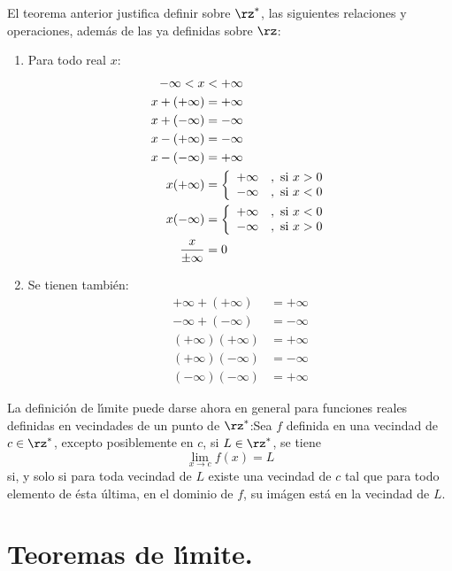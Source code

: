 El teorema anterior justifica definir sobre $\rz^{\ast}$, las siguientes
relaciones y operaciones, adem\'{a}s de las ya definidas sobre $\rz$:

\begin{enumerate}
\item Para todo real $x$:
\begin{align}
-\infty<x  &  <+\infty\\
x+(+\infty)  &  =+\infty\\
x+(-\infty)  &  =-\infty\\
x-(+\infty)  &  =-\infty\\
x-(-\infty)  &  =+\infty\\
x(+\infty)  &  =\left\{
\begin{array}
[c]{cc}%
+\infty & ,\text{ si }x>0\\
-\infty & ,\text{ si }x<0
\end{array}
\right. \\
x(-\infty)  &  =\left\{
\begin{array}
[c]{cc}%
+\infty & ,\text{ si }x<0\\
-\infty & ,\text{ si }x>0
\end{array}
\right. \\
\frac{x}{\pm\infty}  &  =0
\end{align}


\item Se tienen tambi\'{e}n:
\begin{align}
+\infty+(+\infty)  &  =+\infty\\
-\infty+(-\infty)  &  =-\infty\\
(+\infty)(+\infty)  &  =+\infty\\
(+\infty)(-\infty)  &  =-\infty\\
(-\infty)(-\infty)  &  =+\infty
\end{align}

\end{enumerate}

La definici\'{o}n de l\'{\i}mite puede darse ahora en general para funciones
reales definidas en vecindades de un punto de $\rz^{\ast}$:\newline Sea $f$
definida en una vecindad de $c\in\rz^{\ast}$, excepto posiblemente en $c$, si
$L\in\rz^{\ast}$, se tiene
\[
\lim_{x\rightarrow c}f(x)=L
\]
si, y solo si para toda vecindad de $L$ existe una vecindad de $c$ tal que
para todo elemento de \'{e}sta \'{u}ltima, en el dominio de $f$, su im\'{a}gen
est\'{a} en la vecindad de $L$.

\section{Teoremas de l\'{\i}mite.}

